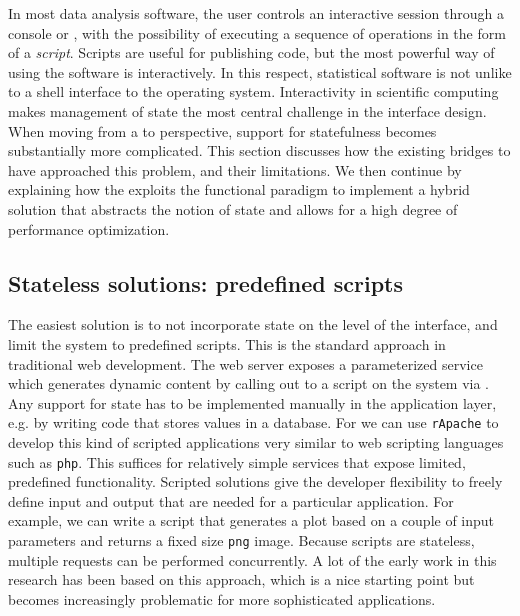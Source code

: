 
In most data analysis software, the user controls an interactive session through a console or \GUI, with the possibility of executing a sequence of operations in the form of a \emph{script}. Scripts are useful for publishing code, but the most powerful way of using the software is interactively. In this respect, statistical software is not unlike to a shell interface to the operating system. Interactivity in scientific computing makes management of state the most central challenge in the interface design. When moving from a \UI to \API perspective, support for statefulness becomes substantially more complicated. This section discusses how the existing bridges to \R have approached this problem, and their limitations. We then continue by explaining how the \OpenCPU \API exploits the functional paradigm to implement a hybrid solution that abstracts the notion of state and allows for a high degree of performance optimization.

\subsection{Stateless solutions: predefined scripts}

The easiest solution is to not incorporate state on the level of the interface, and limit the system to predefined scripts. This is the standard approach in traditional web development. The web server exposes a parameterized service which generates dynamic content by calling out to a script on the system via \CGI. Any support for state has to be implemented manually in the application layer, e.g. by writing code that stores values in a database. For \R we can use \texttt{rApache} \citep{horner2013rapache} to develop this kind of scripted applications very similar to web scripting languages such as \texttt{php}. This suffices for relatively simple services that expose limited, predefined functionality. Scripted solutions give the developer flexibility to freely define input and output that are needed for a particular application. For example, we can write a script that generates a plot based on a couple of input parameters and returns a fixed size \texttt{png} image. Because scripts are stateless, multiple requests can be performed concurrently. A lot of the early work in this research has been based on this approach, which is a nice starting point but becomes increasingly problematic for more sophisticated applications.


